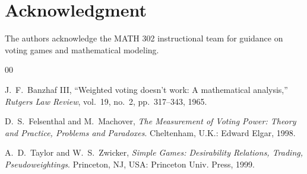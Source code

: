 \documentclass[lettersize,journal]{IEEEtran}
\begin{document}
\section*{Acknowledgment}
The authors acknowledge the MATH 302 instructional team for guidance on voting games and mathematical modeling.

\begin{thebibliography}{00}

J.~F.~Banzhaf III, ``Weighted voting doesn't work: A mathematical analysis,'' \emph{Rutgers Law Review}, vol.~19, no.~2, pp.~317--343, 1965.

D.~S.~Felsenthal and M.~Machover, \emph{The Measurement of Voting Power: Theory and Practice, Problems and Paradoxes}. Cheltenham, U.K.: Edward Elgar, 1998.

A.~D.~Taylor and W.~S.~Zwicker, \emph{Simple Games: Desirability Relations, Trading, Pseudoweightings}. Princeton, NJ, USA: Princeton Univ. Press, 1999.

\end{thebibliography}
\end{document}
